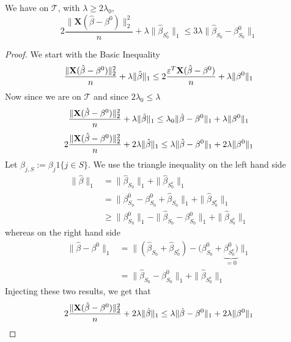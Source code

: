 \begin{lemma}[Lemma 6.3.]
    We have on $\mathscr{T}$, with $\lambda \geq 2 \lambda_{0}$,
    $$
        2\frac{ \|\mathbf{X} (\hat{\beta}-\beta^{0} ) \|_{2}^{2}}{n} + \lambda \|\hat{\beta}_{S_{0}^{c}} \|_{1} \leq 3 \lambda \|\hat{\beta}_{S_{0}}-\beta_{S_{0}}^{0} \|_{1}
    $$
\end{lemma}
\begin{proof}
    We start with the Basic Inequality
    $$
        \frac{\| \mathbf{X} (\hat{\beta}-\beta^{0})\|_{2}^{2}}{n} + \lambda\|\hat{\beta}\|_{1} \leq 2 \frac{\varepsilon^{T} \mathbf{X} (\hat{\beta}-\beta^{0})}{n}+\lambda\|\beta^{0}\|_{1}
    $$
    Now since we are on $\mathscr{T}$ and since $2 \lambda_0 \leq \lambda$
    $$
        \frac{\| \mathbf{X} (\hat{\beta}-\beta^{0})\|_{2}^{2}}{n} + \lambda\|\hat{\beta}\|_{1} \leq \lambda_0 \|\hat{\beta}-\beta^{0}\|_1 + \lambda\|\beta^{0}\|_{1}
    $$
    $$
        2 \frac{\| \mathbf{X} (\hat{\beta}-\beta^{0})\|_{2}^{2}}{n}+2 \lambda\|\hat{\beta}\|_{1} \leq \lambda \|\hat{\beta}-\beta^{0} \|_{1}+2 \lambda \|\beta^{0} \|_{1}
    $$
    Let $\beta_{j, S}:=\beta_{j} 1\{j \in S\}$. We use the triangle inequality on the left hand side
    \begin{align*}
        \|\hat{\beta}\|_{1}
         & = \|\hat{\beta}_{S_{0}} \|_{1} + \|\hat{\beta}_{S_{0}^{c}} \|_{1}                                                  \\
         & = \|\beta_{S_{0}}^{0} - \beta_{S_{0}}^{0} + \hat{\beta}_{S_{0}} \|_{1} + \|\hat{\beta}_{S_{0}^{c}} \|_{1}          \\
         & \geq \|\beta_{S_{0}}^{0} \|_{1} - \|\hat{\beta}_{S_{0}}-\beta_{S_{0}}^{0} \|_{1}+ \|\hat{\beta}_{S_{0}^{c}} \|_{1}
    \end{align*}
    whereas on the right hand side
    \begin{align*}
        \|\hat{\beta}-\beta^{0} \|_{1}
         & =  \| (\hat{\beta}_{S_{0}} + \hat{\beta}_{S_{0}^{c}}) - (\beta_{S_{0}}^{0} + \underbrace{\beta_{S_{0}^{c}}^0)}_{=0} \|_{1} \\
         & =  \| \hat{\beta}_{S_{0}}-\beta_{S_{0}}^{0} \|_{1} + \|\hat{\beta}_{S_{0}^{c}} \|_{1}
    \end{align*}
    Injecting these two results, we get that
    \begin{align*}
                 & 2 \frac{\| \X (\hat{\beta}-\beta^{0})\|_{2}^{2}}{n} + 2 \lambda\|\hat{\beta}\|_{1} \leq \lambda \|\hat{\beta}-\beta^{0} \|_{1}+2 \lambda \|\beta^{0} \|_{1}                                                                                                  \\

\end{align*}
\end{proof}
